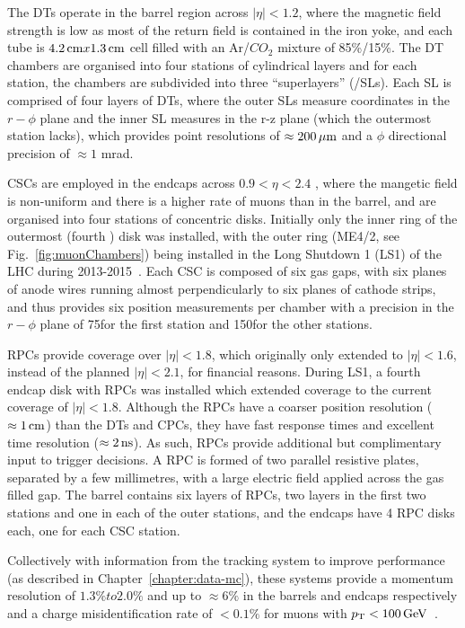 The DTs operate in the barrel region across $|\eta| < 1.2$, where the magnetic field strength is low as most of the return field is contained in the iron yoke,	and each tube is $4.2\,\text{cm} x 1.3\,\text{cm}$ cell filled with an Ar/$CO_{2}$ mixture of 85\%/15\%.
The DT chambers are organised into four stations of cylindrical layers and for each station, the chambers are subdivided into three ``superlayers'' (/SLs).
Each SL is comprised of four layers of DTs, where the outer SLs measure coordinates in the $r-\phi$ plane and the inner SL measures in the r-z plane (which the outermost station lacks), which provides point resolutions of $\approx 200\,\mu\text{m}$ and a $\phi$ directional precision of $\approx 1$ mrad.

CSCs are employed in the endcaps across $0.9 < \eta < 2.4$ , where the mangetic field is non-uniform and there is a higher rate of muons than in the barrel, and are organised into four stations of concentric disks.
Initially only the inner ring of the outermost (fourth ) disk was installed, with the outer ring (ME4/2, see Fig.~\ref{fig:muonChambers}) being installed in the Long Shutdown 1 (LS1) of the LHC during 2013-2015~\cite{Battilana:2017mrm}.
Each CSC is composed of six gas gaps, with six planes of anode wires running almost perpendicularly to six planes of cathode strips, and thus provides six position measurements per chamber with a precision in the $r-\phi$ plane of 75\mum for the first station and 150\mum for the other stations\cite{CMS:1997iti}.

RPCs provide coverage over $|\eta| < 1.8$, which originally only extended to $|\eta| < 1.6$, instead of the planned $|\eta| < 2.1$, for financial reasons. 
During LS1, a fourth endcap disk with RPCs was installed which extended coverage to the current coverage of $|\eta| < 1.8$\cite{Battilana:2017mrm}.
Although the RPCs have a coarser position resolution ($\approx 1\,\text{cm}$) than the DTs and CPCs, they have fast response times and excellent time resolution ($\approx 2\text{\,ns}$).
As such, RPCs provide additional but complimentary input to trigger decisions.
A RPC is formed of two parallel resistive plates, separated by a few millimetres, with a large electric field applied across the gas filled gap.
The barrel contains six layers of RPCs, two layers in the first two stations and one in each of the outer stations, and the endcaps have 4 RPC disks each, one for each CSC station.

Collectively with information from the tracking system to improve performance (as described in Chapter~\ref{chapter:data-mc}), these systems provide a momentum resolution of $1.3\% to 2.0\%$ and up to $\approx 6\%$ in the barrels and endcaps respectively and a charge misidentification rate of $< 0.1\%$ for muons with $p_{\mathrm{T}} < 100 \,\text{Ge\hspace{-.08em}V}$~\cite{Chatrchyan:2012xi,Chatrchyan:2013sba}.

